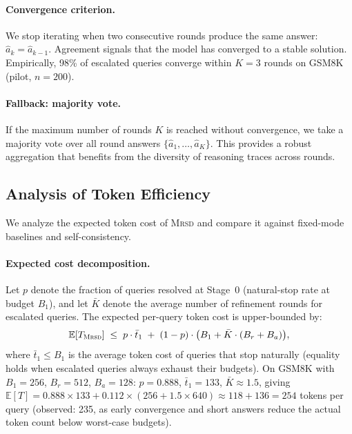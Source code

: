 \paragraph{Convergence criterion.}
We stop iterating when two consecutive rounds produce the same
answer: $\hat{a}_k = \hat{a}_{k-1}$.
Agreement signals that the model has converged to a stable solution.
Empirically, 98\% of escalated queries converge within $K{=}3$ rounds
on GSM8K (pilot, $n{=}200$).

\paragraph{Fallback: majority vote.}
If the maximum number of rounds $K$ is reached without convergence,
we take a majority vote over all round answers
$\{\hat{a}_1, \ldots, \hat{a}_K\}$.
This provides a robust aggregation that benefits from the diversity of
reasoning traces across rounds.

\subsection{Analysis of Token Efficiency}
\label{sec:method:cost}

We analyze the expected token cost of \textsc{Mrsd} and compare it
against fixed-mode baselines and self-consistency.

\paragraph{Expected cost decomposition.}
Let $p$ denote the fraction of queries resolved at Stage~0
(natural-stop rate at budget $B_1$), and let $\bar{K}$ denote the
average number of refinement rounds for escalated queries.
The expected per-query token cost is upper-bounded by:
\begin{equation}
  \label{eq:mrsd-cost}
  \mathbb{E}[T_{\textsc{Mrsd}}]
  \;\le\; p \cdot \bar{t}_1
  \;+\; (1-p) \cdot \bigl(B_1 + \bar{K} \cdot (B_r + B_a)\bigr),
\end{equation}
where $\bar{t}_1 \le B_1$ is the average token cost of queries that
stop naturally (equality holds when escalated queries always exhaust
their budgets).
On GSM8K with $B_1{=}256$, $B_r{=}512$, $B_a{=}128$: $p = 0.888$,
$\bar{t}_1 = 133$, $\bar{K} \approx 1.5$, giving
$\mathbb{E}[T] = 0.888 \times 133 + 0.112 \times (256 + 1.5 \times 640)
\approx 118 + 136 = 254$ tokens per query (observed: 235, as early
convergence and short answers reduce the actual token count below
worst-case budgets).

